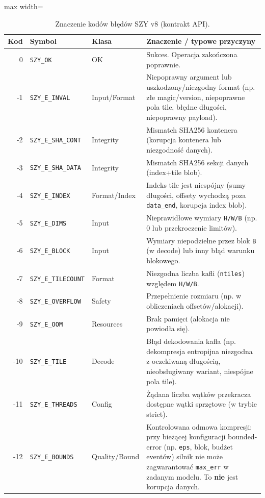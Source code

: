 \documentclass[11pt,a4paper]{article}
\begin{document}
\begin{table}[H]
\centering
\caption{Znaczenie kodów błędów SZY v8 (kontrakt API).}
\label{tab:error_codes_meaning}
\begin{adjustbox}{max width=\textwidth}
\begin{tabular}{@{}rllp{8.8cm}@{}}
\toprule
Kod & Symbol & Klasa & Znaczenie / typowe przyczyny \\
\midrule
0   & \texttt{SZY\_OK} & OK &
Sukces. Operacja zakończona poprawnie. \\
-1  & \texttt{SZY\_E\_INVAL} & Input/Format &
Niepoprawny argument lub uszkodzony/niezgodny format (np. złe magic/version, niepoprawne pola tile, błędne długości, niepoprawny payload). \\
-2  & \texttt{SZY\_E\_SHA\_CONT} & Integrity &
Mismatch SHA256 kontenera (korupcja kontenera lub niezgodność danych). \\
-3  & \texttt{SZY\_E\_SHA\_DATA} & Integrity &
Mismatch SHA256 sekcji danych (index+tile blob). \\
-4  & \texttt{SZY\_E\_INDEX} & Format/Index &
Indeks tile jest niespójny (sumy długości, offsety wychodzą poza \texttt{data\_end}, korupcja index blob). \\
-5  & \texttt{SZY\_E\_DIMS} & Input &
Nieprawidłowe wymiary \texttt{H/W/B} (np. 0 lub przekroczenie limitów). \\
-6  & \texttt{SZY\_E\_BLOCK} & Input &
Wymiary niepodzielne przez blok \texttt{B} (w decode) lub inny błąd warunku blokowego. \\
-7  & \texttt{SZY\_E\_TILECOUNT} & Format &
Niezgodna liczba kafli (\texttt{ntiles}) względem \texttt{H/W/B}. \\
-8  & \texttt{SZY\_E\_OVERFLOW} & Safety &
Przepełnienie rozmiaru (np. w obliczeniach offsetów/alokacji). \\
-9  & \texttt{SZY\_E\_OOM} & Resources &
Brak pamięci (alokacja nie powiodła się). \\
-10 & \texttt{SZY\_E\_TILE} & Decode &
Błąd dekodowania kafla (np. dekompresja entropijna niezgodna z oczekiwaną długością, nieobsługiwany wariant, niespójne pola tile). \\
-11 & \texttt{SZY\_E\_THREADS} & Config &
Żądana liczba wątków przekracza dostępne wątki sprzętowe (w trybie strict). \\
-12 & \texttt{SZY\_E\_BOUNDS} & Quality/Bound &
Kontrolowana odmowa kompresji: przy bieżącej konfiguracji bounded-error (np. \texttt{eps}, blok, budżet eventów) silnik nie może zagwarantować \texttt{max\_err} w zadanym modelu. To \textbf{nie} jest korupcja danych. \\
\bottomrule
\end{tabular}
\end{adjustbox}
\end{table}
\end{document}
